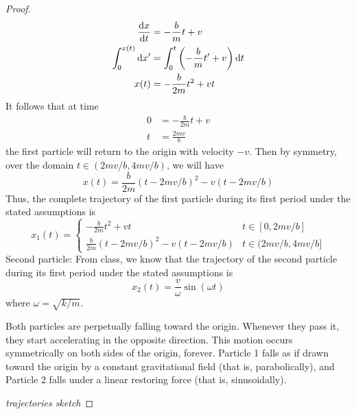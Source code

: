 \documentclass[../psets.tex]{subfiles}
\begin{document}
\begin{enumerate}
\begin{enumerate}
\begin{proof}
\begin{align*}
                \dv{x}{t} &= -\frac{b}{m}t+v\\
                \int_0^{x(t)}\dd{x'} &= \int_0^t\left( -\frac{b}{m}t'+v \right)\dd{t}\\
                x(t) &= -\frac{b}{2m}t^2+vt
            \end{align*}
            It follows that at time
            \begin{align*}
                0 &= -\frac{b}{2m}t+v\\
                t &= \frac{2mv}{b}
            \end{align*}
            the first particle will return to the origin with velocity $-v$. Then by symmetry, over the domain $t\in(2mv/b,4mv/b)$, we will have
            \begin{equation*}
                x(t) = \frac{b}{2m}(t-2mv/b)^2-v(t-2mv/b)
            \end{equation*}
            Thus, the complete trajectory of the first particle during its first period under the stated assumptions is
            \begin{equation*}
                \boxed{
                    x_1(t) =
                    \begin{cases}
                        -\frac{b}{2m}t^2+vt & t\in[0,2mv/b]\\
                        \frac{b}{2m}(t-2mv/b)^2-v(t-2mv/b)  & t\in(2mv/b,4mv/b]
                    \end{cases}
                }
            \end{equation*}
            Second particle: From class, we know that the trajectory of the second particle during its first period under the stated assumptions is
            \begin{equation*}
                \boxed{x_2(t) = \frac{v}{\omega}\sin(\omega t)}
            \end{equation*}
            where $\omega=\sqrt{k/m}$.\par\medskip
            Both particles are perpetually falling toward the origin. Whenever they pass it, they start accelerating in the opposite direction. This motion occurs symmetrically on both sides of the origin, forever. Particle 1 falls as if drawn toward the origin by a constant gravitational field (that is, parabolically), and Particle 2 falls under a linear restoring force (that is, sinusoidally).

            \emph{trajectories sketch}


\end{proof}
\end{enumerate}
\end{enumerate}
\end{document}
